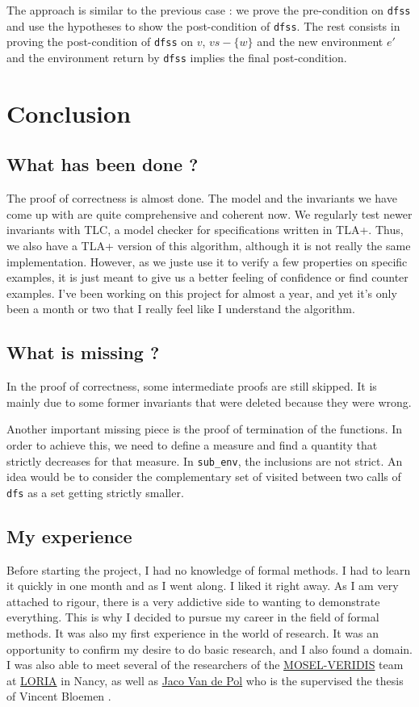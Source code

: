\documentclass[a4 paper, 12pt]{article}
\begin{document}
{The approach is similar to the previous case : we prove the pre-condition on \texttt{dfss} and use the hypotheses to show the post-condition of \texttt{dfss}. The rest consists in proving the post-condition of \texttt{dfss} on $v$, $vs - \{w\}$ and the new environment $e'$ and the environment return by \texttt{dfss} implies the final post-condition.


\section{Conclusion}
\subsection{What has been done ?}
The proof of correctness is almost done. The model and the invariants we have come up with are quite comprehensive and coherent now. We regularly test newer invariants with TLC, a model checker for specifications written in TLA+. Thus, we also have a TLA+ version of this algorithm, although it is not really the same implementation. However, as we juste use it to verify a few properties on specific examples, it is just meant to give us a better feeling of confidence or find counter examples. I've been working on this project for almost a year, and yet it's only been a month or two that I really feel like I understand the algorithm.

\subsection{What is missing ?}
In the proof of correctness, some intermediate proofs are still skipped. It is mainly due to some former invariants that were deleted because they were wrong.

\BlankLine

Another important missing piece is the proof of termination of the functions. In order to achieve this, we need to define a measure and find a quantity that strictly decreases for that measure. In \texttt{sub\_env}, the inclusions are not strict. An idea would be to consider the complementary set of visited between two calls of \texttt{dfs} as a set getting strictly smaller.

\subsection{My experience}
Before starting the project, I had no knowledge of formal methods. I had to learn it quickly in one month and as I went along. I liked it right away. As I am very attached to rigour, there is a very addictive side to wanting to demonstrate everything. This is why I decided to pursue my career in the field of formal methods.
\BlankLine
It was also my first experience in the world of research. It was an opportunity to confirm my desire to do basic research, and I also found a domain. I was also able to meet several of the researchers of the \href{https://www.loria.fr/fr/la-recherche/les-equipes/mosel-veridis/}{MOSEL-VERIDIS} team at \href{https://www.loria.fr/en/}{LORIA} in Nancy, as well as \href{https://cs.au.dk/~jaco/}{Jaco Van de Pol} who is the supervised the thesis of Vincent Bloemen \cite{bloemen_strong_2019}.


}
\end{document}
